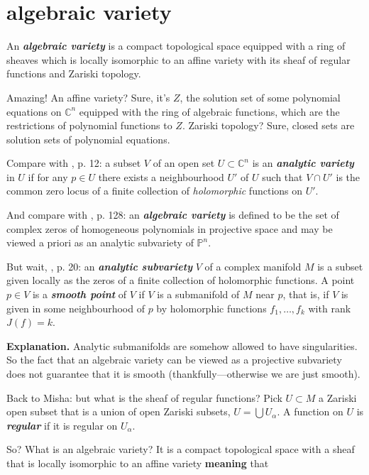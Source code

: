 \section{algebraic variety}

An \textit{\textbf{algebraic variety}} is a compact topological space equipped with a ring of sheaves which is locally isomorphic to an affine variety with its sheaf of regular functions and Zariski topology.

Amazing! An affine variety? Sure, it's \(Z\), the solution set of some polynomial equations on \(\mathbb{C}^n\) equipped with the ring of algebraic functions, which are the restrictions of polynomial functions to \(Z\). Zariski topology? Sure, closed sets are solution sets of polynomial equations.

Compare with \cite{gri}, p. 12: a subset \(V\) of an open set \(U \subset \mathbb{C}^n\) is an \textit{\textbf{analytic variety}} in \(U\) if for any \(p \in U\) there exists a neighbourhood \(U'\) of \(U\) such that \(V \cap U'\) is the common zero locus of a finite collection of \textit{holomorphic} functions on \(U'\).

And compare with \cite{gri}, p. 128: an \textit{\textbf{algebraic variety}} is defined to be the set of complex zeros of homogeneous polynomials in projective space and may be viewed a priori as an analytic subvariety of \(\mathbb{P}^n\).

But wait, \cite{gri}, p. 20: an \textit{\textbf{analytic subvariety}} \(V\) of a complex manifold \(M\) is a subset given locally as the zeros of a finite collection of holomorphic functions. A point \(p \in V\) is a \textit{\textbf{smooth point}} of \(V\) if \(V\) is a submanifold of \(M\) near \(p\), that is, if \(V\) is given in some neighbourhood of \(p\) by holomorphic functions \(f_1,\ldots,f_k\) with rank \(J(f)=k\).

\textbf{Explanation.} Analytic submanifolds are somehow allowed to have singularities. So the fact that an algebraic variety can be viewed as a projective subvariety does not guarantee that it is smooth (thankfully---otherwise we are just smooth).



Back to Misha: but what is the sheaf of regular functions? Pick \(U \subset M\) a Zariski open subset that is a union of open Zariski subsets, \(U=\bigcup U_\alpha\). A function on \(U\) is \textit{\textbf{regular}} if it is regular on \(U_\alpha\).

So? What is an algebraic variety? It is a compact topological space with a sheaf that is locally isomorphic to an affine variety \textbf{meaning} that 

